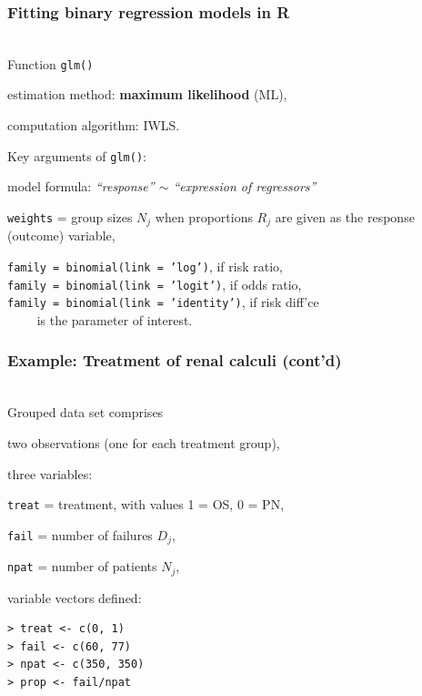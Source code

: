 \documentclass[handout,12pt]{beamer}
\begin{document}
\begin{frame}[fragile] \frametitle{Fitting binary regression models in R}
\ \\
Function {\tt glm()}
\bi
\item estimation method: {\bf maximum likelihood} (ML),
\item computation algorithm: IWLS.
\ei

\medskip
Key arguments of {\tt glm()}:
\bi
\item model formula: {\it ``response'' $\sim$ ``expression of regressors''}
\medskip
\item {\tt weights} = group sizes $N_j$ when proportions $R_j$ are given as the response (outcome) variable,
\medskip
\item
\small {\tt family = binomial(link = 'log')}, if risk ratio,\\
      {\tt family = binomial(link = 'logit')}, if odds ratio, \\
      {\tt family = binomial(link = 'identity')}, if risk diff'ce \\
      $\qquad$ is the parameter of interest.
\normalsize      
\ei
\end{frame}


\begin{frame}[fragile] \frametitle{Example: Treatment of renal calculi (cont'd)}
\ \\
Grouped data set comprises
\bi
\item two observations (one for each treatment group),\medskip
\item three variables: 
  \bi
   \item[ ]
        {\tt treat} = treatment, with values 1 = OS, 0 = PN,
   \item[ ]        
        {\tt fail} = number of failures $D_j$, 
   \item[ ]
        {\tt npat} = number of patients $N_j$,
  \ei
\item variable vectors defined:
\small
\begin{verbatim}
> treat <- c(0, 1)
> fail <- c(60, 77)
> npat <- c(350, 350)
> prop <- fail/npat
\end{verbatim}
\normalsize
\ei
\end{frame} 

\end{document}

